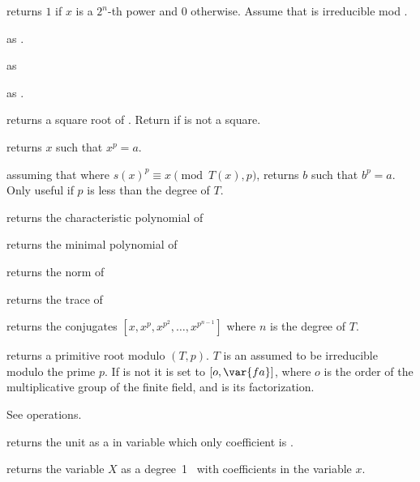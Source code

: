  returns $1$ if $x$ is
a $2^n$-th power and $0$ otherwise. Assume that  is irreducible mod
.

as .

as 

 as
.

 returns a square root of .
Return  if  is not a square.

 returns $x$ such that $x^p = a$.

 assuming that
 where $s(x)^p \equiv x\pmod{T(x),p}$,
returns $b$ such that $b^p=a$. Only useful if $p$ is less than the degree of
$T$.

 returns the characteristic
polynomial of 

 returns the minimal polynomial
of 

 returns the norm of 

 returns the trace of 

 returns the conjugates
$[x,x^p,x^{p^2},\ldots,x^{p^{n-1}}]$ where $n$ is the degree of $T$.

 returns a primitive root modulo
$(T,p)$. $T$ is an  assumed to be irreducible modulo the prime
$p$. If  is not  it is set to $[o,\var{fa}]$, where $o$ is the
order of the multiplicative group of the finite field, and  is
its factorization.

 See  operations.

 returns the unit  as a
 in variable  which only coefficient is .

 returns the variable $X$ as a
degree~1~ with  coefficients in the variable $x$.

